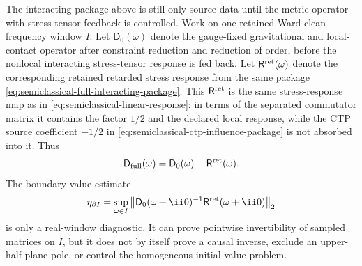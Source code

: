 \begin{controlledapproximation}
\label{ca:semiclassical-backreaction-small-gain-stability}
The interacting package above is still only source data until the metric
operator with stress-tensor feedback is controlled.  Work on one retained
Ward-clean frequency window \(I\).  Let \(\mathsf D_0(\omega)\) denote the
gauge-fixed gravitational and local-contact operator after constraint
reduction and reduction of order, before the nonlocal interacting
stress-tensor response is fed back.  Let
\(\mathsf R^{\rm ret}(\omega)\) denote the corresponding retained retarded
stress response from the same package
\eqref{eq:semiclassical-full-interacting-package}.  This
\(\mathsf R^{\rm ret}\) is the same stress-response map as in
\eqref{eq:semiclassical-linear-response}: in terms of the separated commutator
matrix it contains the factor \(1/2\) and the declared local response, while the
CTP source coefficient \(-1/2\) in
\eqref{eq:semiclassical-ctp-influence-package} is not absorbed into it.  Thus
\begin{equation}
  \mathsf D_{\rm full}(\omega)
  =
  \mathsf D_0(\omega)-\mathsf R^{\rm ret}(\omega).
  \label{eq:semiclassical-full-feedback-operator}
\end{equation}
The boundary-value estimate
\[
  \eta_{\partial I}
  =
  \sup_{\omega\in I}
  \left\lVert
    \mathsf D_0(\omega+\ii0)^{-1}
    \mathsf R^{\rm ret}(\omega+\ii0)
  \right\rVert_2
\]
is only a real-window diagnostic.  It can prove pointwise invertibility of
sampled matrices on \(I\), but it does not by itself prove a causal inverse,
exclude an upper-half-plane pole, or control the homogeneous initial-value
problem.


\end{controlledapproximation}
